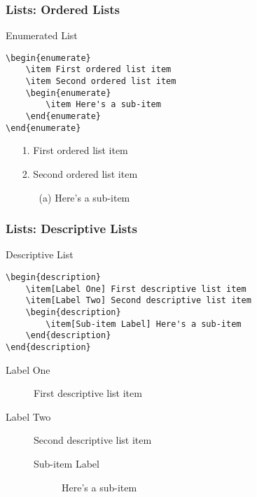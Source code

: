 \begin{frame}[fragile]
\frametitle{Lists: Ordered Lists}
\begin{block}{Enumerated List}
\begin{verbatim}
\begin{enumerate}
    \item First ordered list item
    \item Second ordered list item
    \begin{enumerate}
        \item Here's a sub-item
    \end{enumerate}
\end{enumerate}
\end{verbatim}
\end{block}
\begin{exampleblock}{}
\begin{itemize}
    \item[1.] First ordered list item
    \item[2.] Second ordered list item
    \begin{itemize}
        \item[(a)] Here's a sub-item
    \end{itemize}
\end{itemize}
\end{exampleblock}
\end{frame}


\begin{frame}[fragile]
\frametitle{Lists: Descriptive Lists}
\begin{block}{Descriptive List}
\begin{verbatim}
\begin{description}
    \item[Label One] First descriptive list item
    \item[Label Two] Second descriptive list item 
    \begin{description}
        \item[Sub-item Label] Here's a sub-item
    \end{description}
\end{description}
\end{verbatim}
\end{block}
\begin{exampleblock}{}
\begin{description}
    \item[Label One] First descriptive list item
    \item[Label Two] Second descriptive list item 
    \begin{description}
        \item[Sub-item Label] Here's a sub-item
    \end{description}
\end{description}
\end{exampleblock}
\end{frame}